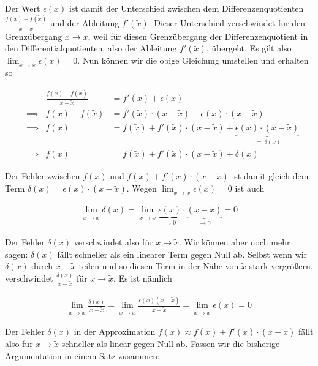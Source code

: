 \documentclass[fontsize=9pt,
               parskip=half-,
               DIV=14,
               listof=chapterentry,
               tocflat]{scrbook}
\begin{document}
Der Wert $\epsilon (x)$ ist damit der Unterschied zwischen dem Differenzenquotienten ${\tfrac {f(x)-f({\tilde {x}})}{x-{\tilde {x}}}}$ und der Ableitung $f'({\tilde {x}})$. Dieser Unterschied verschwindet für den Grenzübergang $x\to {\tilde {x}}$, weil für diesen Grenzübergang der Differenzenquotient in den Differentialquotienten, also der Ableitung $f'({\tilde {x}})$, übergeht. Es gilt also $\lim _{x\to {\tilde {x}}}\epsilon (x)=0$. Nun können wir die obige Gleichung umstellen und erhalten so

\begin{align*}
&&{\frac {f(x)-f({\tilde {x}})}{x-{\tilde {x}}}}&=f'({\tilde {x}})+\epsilon (x)\\[0.3em]&\implies {}&f(x)-f({\tilde {x}})&=f'({\tilde {x}})\cdot (x-{\tilde {x}})+\epsilon (x)\cdot (x-{\tilde {x}})\\[0.3em]&\implies {}&f(x)&=f({\tilde {x}})+f'({\tilde {x}})\cdot (x-{\tilde {x}})+\underbrace {\epsilon (x)\cdot (x-{\tilde {x}})} _{:=\ \delta (x)}\\[0.3em]&\implies {}&f(x)&=f({\tilde {x}})+f'({\tilde {x}})\cdot (x-{\tilde {x}})+\delta (x)
\end{align*}

Der Fehler zwischen $f(x)$ und $f({\tilde {x}})+f'({\tilde {x}})\cdot (x-{\tilde {x}})$ ist damit gleich dem Term $\delta (x)=\epsilon (x)\cdot (x-{\tilde {x}})$. Wegen $\lim _{x\to {\tilde {x}}}\epsilon (x)=0$ ist auch

\begin{align*}
\lim _{x\to {\tilde {x}}}\delta (x)=\lim _{x\to {\tilde {x}}}\underbrace {\epsilon (x)} _{\to 0}\cdot \underbrace {(x-{\tilde {x}})} _{\to 0}=0
\end{align*}

Der Fehler $\delta (x)$ verschwindet also für $x\to {\tilde {x}}$. Wir können aber noch mehr sagen: $\delta (x)$ fällt schneller als ein linearer Term gegen Null ab. Selbst wenn wir $\delta (x)$ durch $x-{\tilde {x}}$ teilen und so diesen Term in der Nähe von ${\tilde {x}}$ stark vergrößern, verschwindet ${\tfrac {\delta (x)}{x-{\tilde {x}}}}$ für $x\to {\tilde {x}}$. Es ist nämlich

\begin{align*}
\lim _{x\to {\tilde {x}}}{\frac {\delta (x)}{x-{\tilde {x}}}}=\lim _{x\to {\tilde {x}}}{\frac {\epsilon (x)(x-{\tilde {x}})}{x-{\tilde {x}}}}=\lim _{x\to {\tilde {x}}}\epsilon (x)=0
\end{align*}

Der Fehler $\delta (x)$ in der Approximation $f(x)\approx f({\tilde {x}})+f'({\tilde {x}})\cdot (x-{\tilde {x}})$ fällt also für $x\to {\tilde {x}}$ schneller als linear gegen Null ab. Fassen wir die bisherige Argumentation in einem Satz zusammen:
\end{document}

